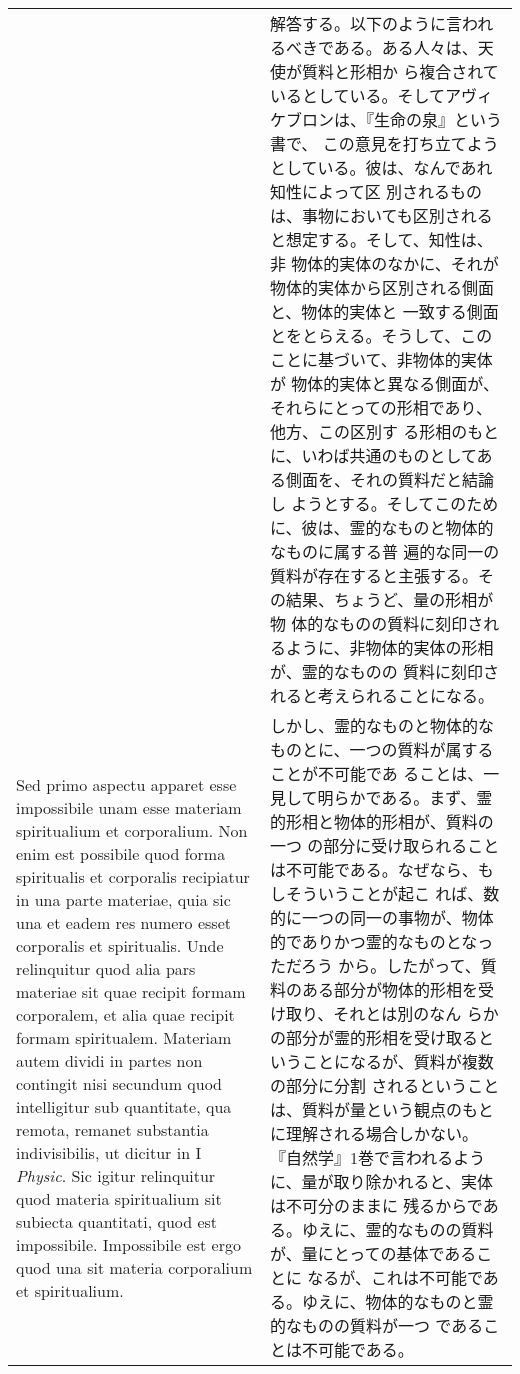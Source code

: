 \documentclass[10pt]{jsarticle} %
\begin{document}
\begin{longtable}{p{21em}p{21em}}
&

解答する。以下のように言われるべきである。ある人々は、天使が質料と形相か
 ら複合されているとしている。そしてアヴィケブロンは、『生命の泉』という書で、
 この意見を打ち立てようとしている。彼は、なんであれ知性によって区
 別されるものは、事物においても区別されると想定する。そして、知性は、非
 物体的実体のなかに、それが物体的実体から区別される側面と、物体的実体と
 一致する側面とをとらえる。そうして、このことに基づいて、非物体的実体が
 物体的実体と異なる側面が、それらにとっての形相であり、他方、この区別す
 る形相のもとに、いわば共通のものとしてある側面を、それの質料だと結論し
 ようとする。そしてこのために、彼は、霊的なものと物体的なものに属する普
 遍的な同一の質料が存在すると主張する。その結果、ちょうど、量の形相が物
 体的なものの質料に刻印されるように、非物体的実体の形相が、霊的なものの
 質料に刻印されると考えられることになる。

\\

Sed primo aspectu apparet esse impossibile unam esse materiam
spiritualium et corporalium. Non enim est possibile quod forma
spiritualis et corporalis recipiatur in una parte materiae, quia sic una
et eadem res numero esset corporalis et spiritualis. Unde relinquitur
quod alia pars materiae sit quae recipit formam corporalem, et alia quae
recipit formam spiritualem. Materiam autem dividi in partes non
contingit nisi secundum quod intelligitur sub quantitate, qua remota,
remanet substantia indivisibilis, ut dicitur in I {\itshape Physic}. Sic
igitur relinquitur quod materia spiritualium sit subiecta quantitati,
quod est impossibile. Impossibile est ergo quod una sit materia
corporalium et spiritualium.


&

しかし、霊的なものと物体的なものとに、一つの質料が属することが不可能であ
 ることは、一見して明らかである。まず、霊的形相と物体的形相が、質料の一つ
 の部分に受け取られることは不可能である。なぜなら、もしそういうことが起こ
 れば、数的に一つの同一の事物が、物体的でありかつ霊的なものとなっただろう
 から。したがって、質料のある部分が物体的形相を受け取り、それとは別のなん
 らかの部分が霊的形相を受け取るということになるが、質料が複数の部分に分割
 されるということは、質料が量という観点のもとに理解される場合しかない。
 『自然学』1巻で言われるように、量が取り除かれると、実体は不可分のままに
 残るからである。ゆえに、霊的なものの質料が、量にとっての基体であることに
 なるが、これは不可能である。ゆえに、物体的なものと霊的なものの質料が一つ
 であることは不可能である。



\end{longtable}
\end{document}

